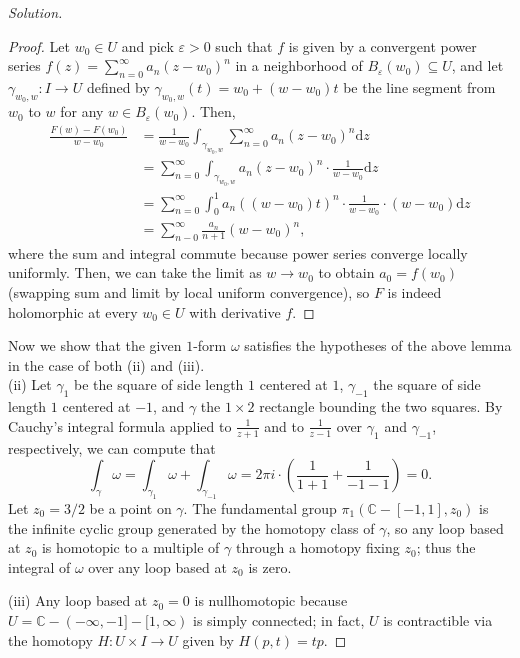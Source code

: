 \documentclass[10pt]{article}
\newcommand{\dd}{\mathrm{d}}
\providecommand{\eps}{\varepsilon}
\providecommand{\CC}{\mathbb C}
\newenvironment{soln}{\begin{proof}[Solution]}{\end{proof}}
\begin{document}
\begin{soln}
    \begin{proof}
        Let $w_0\in U$ and pick $\eps>0$ such that $f$
	is given by a convergent power series
	$f(z) = \sum_{n=0}^\infty a_n(z-w_0)^n$
	in a neighborhood of $B_\eps(w_0)\subseteq U$,
	and let $\gamma_{w_0,w}\colon I\to U$
	defined by $\gamma_{w_0,w}(t) = w_0 + (w-w_0)t$ be
	the line segment from $w_0$ to $w$ for any $w\in B_\eps(w_0)$. Then,
	\begin{align*}
	    \frac{F(w) - F(w_0)}{w-w_0}
	    &= \frac 1{w-w_0}\int_{\gamma_{w_0,w}}
	    \sum_{n=0}^\infty a_n(z-w_0)^n\dd z\\
	    &= \sum_{n=0}^\infty \int_{\gamma_{w_0,w}}
	    a_n(z-w_0)^n\cdot \frac 1{w-w_0}\dd z\\
	    &= \sum_{n=0}^\infty \int_0^1
	    a_n((w-w_0)t)^n\cdot \frac 1{w-w_0}\cdot(w-w_0)\dd z\\
	    &= \sum_{n-0}^\infty \frac{a_n}{n+1}(w-w_0)^n,
	\end{align*}
	where the sum and integral commute because
	power series converge locally uniformly.
	Then, we can take the limit as $w\to w_0$
	to obtain $a_0 = f(w_0)$ (swapping sum and limit
	by local uniform convergence),
	so $F$ is indeed holomorphic at every $w_0\in U$
	with derivative $f$.
    \end{proof}

    Now we show that the given $1$-form $\omega$
    satisfies the hypotheses of the above lemma
    in the case of both (ii) and (iii).
    \\
    
    (ii) Let $\gamma_1$ be the square of side length $1$ centered at $1$,
    $\gamma_{-1}$ the square of side length $1$ centered at $-1$,
    and $\gamma$ the $1\times 2$ rectangle bounding the two squares.
    By Cauchy's integral formula applied to $\frac 1{z+1}$ and to
    $\frac 1{z-1}$ over $\gamma_1$ and $\gamma_{-1}$, respectively,
    we can compute that
    \begin{equation*}
	\int_\gamma\omega = \int_{\gamma_1}\omega
	+ \int_{\gamma_{-1}}\omega
	= 2\pi i\cdot\left(\frac 1{1+1} + \frac 1{-1-1}\right) = 0.
    \end{equation*}
    Let $z_0 = 3/2$ be a point on $\gamma$.
    The fundamental group $\pi_1(\CC-[-1,1],z_0)$ is
    the infinite cyclic group generated by the homotopy class of $\gamma$,
    so any loop based at $z_0$ is homotopic to a multiple of $\gamma$
    through a homotopy fixing $z_0$; thus the integral of $\omega$
    over any loop based at $z_0$ is zero.

    (iii) Any loop based at $z_0 = 0$ is nullhomotopic
    because $U = \CC - (-\infty,-1] - [1,\infty)$ is simply connected;
    in fact, $U$ is contractible via the homotopy
    $H\colon U\times I\to U$ given by $H(p,t) = tp$.
\end{soln}
\end{document}
